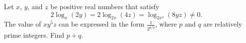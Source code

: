 Let $x$, $y$, and $z$ be positive real numbers that satisfy \[ 2\log_x(2y) = 2\log_{2x}(4z) = \log_{2x^4}(8yz) \neq 0. \] The value of $xy^5z$ can be expressed in the form $\frac{1}{2^{p/q}}$, where $p$ and $q$ are relatively prime integers.  Find $p+q$.